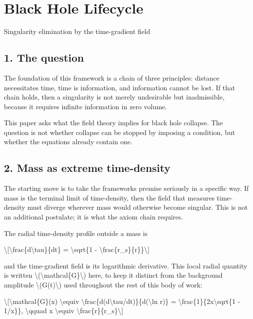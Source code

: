 \documentclass[
  10pt,
]{article}
\author{}
\date{}
\begin{document}
\hypertarget{black-hole-lifecycle}{%
\section{Black Hole Lifecycle}\label{black-hole-lifecycle}}

Singularity elimination by the time-gradient field

\hypertarget{the-question}{%
\subsection{1. The question}\label{the-question}}

The foundation of this framework is a chain of three principles:
distance necessitates time, time is information, and information cannot
be lost. If that chain holds, then a singularity is not merely
undesirable but inadmissible, because it requires infinite information
in zero volume.

This paper asks what the field theory implies for black hole collapse.
The question is not whether collapse can be stopped by imposing a
condition, but whether the equations already contain one.

\hypertarget{mass-as-extreme-time-density}{%
\subsection{2. Mass as extreme
time-density}\label{mass-as-extreme-time-density}}

The starting move is to take the framework\textquotesingle s premise
seriously in a specific way. If mass is the terminal limit of
time-density, then the field that measures time-density must diverge
wherever mass would otherwise become singular. This is not an additional
postulate; it is what the axiom chain requires.

The radial time-density profile outside a mass is

\textbackslash{[}\textbackslash frac\{d\textbackslash tau\}\{dt\} =
\textbackslash sqrt\{1 -
\textbackslash frac\{r\_s\}\{r\}\}\textbackslash{]}

and the time-gradient field is its logarithmic derivative. This local
radial quantity is written
\textbackslash(\textbackslash mathcal\{G\}\textbackslash) here, to keep
it distinct from the background amplitude
\textbackslash(G(t)\textbackslash) used throughout the rest of this body
of work:

\textbackslash{[}\textbackslash mathcal\{G\}(x) \textbackslash equiv
\textbackslash frac\{d(d\textbackslash tau/dt)\}\{d(\textbackslash ln
r)\} = \textbackslash frac\{1\}\{2x\textbackslash sqrt\{1 - 1/x\}\},
\textbackslash qquad x \textbackslash equiv
\textbackslash frac\{r\}\{r\_s\}\textbackslash{]}
\end{document}
